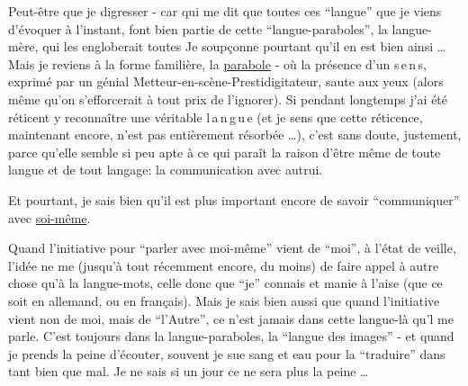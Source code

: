 
Peut-être que  je  digresser - car qui me dit que toutes ces ``langue'' que je viens d'évoquer à l'instant, font bien partie de cette ``langue-paraboles'', la langue-mère, qui les engloberait toutes Je soupçonne pourtant qu'il en est bien ainsi \ldots{} Mais je reviens à la forme familière, la \uline{parabole} -  où la présence d'un \mbox{s\,e\,n\,s}, exprimé par un génial Metteur-en-scène-Prestidigitateur, saute aux yeux (alors même qu'on s'efforcerait à tout prix de l'ignorer). Si pendant longtemps j'ai été réticent  y reconnaître une véritable \mbox{l\,a\,n\,g\,u\,e} (et je sens que cette réticence, maintenant encore, n'est pas entièrement résorbée \ldots), c'est sans doute, justement, parce qu'elle semble si peu apte à ce qui paraît la raison d'être même de toute langue et de tout langage: la communication avec autrui.

Et pourtant, je sais bien qu'il est plus important encore de savoir ``communiquer'' avec \uline{soi-même}.

Quand l'initiative pour ``parler avec moi-même'' vient de ``moi'', à l'état de veille, l'idée ne me   (jusqu'à tout récemment encore, du moins) de faire appel à autre chose qu'à la langue-mots, celle donc que ``je'' connais et manie à l'aise (que ce soit en allemand, ou en français). Mais je sais bien aussi que quand l'initiative vient non de moi, mais de ``l'Autre'', ce n'est jamais  dans cette langue-là qu'l me parle. C'est toujours dans la langue-paraboles, la ``langue des images'' - et quand je prends la peine d'écouter, souvent je sue sang et eau pour la ``traduire'' dans  tant bien que mal. Je ne sais si un jour ce ne sera plus la peine \ldots

